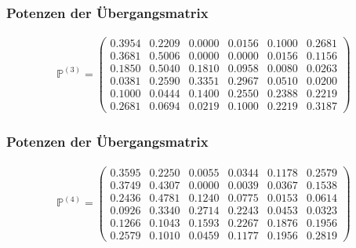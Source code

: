 \documentclass[draft,compress]{beamer}
\begin{document}
	\begin{frame}
		\frametitle{Potenzen der Übergangsmatrix}
		\begin{center}
			\begin{align*}
				\mathbb{P} ^{(3)} =
				\begin{pmatrix} 
				  0.3954 &  0.2209 &  0.0000 &  0.0156 &  0.1000 &  0.2681\\
				  0.3681 &  0.5006 &  0.0000 &  0.0000 &  0.0156 &  0.1156\\
				  0.1850 &  0.5040 &  0.1810 &  0.0958 &  0.0080 &  0.0263\\
				  0.0381 &  0.2590 &  0.3351 &  0.2967 &  0.0510 &  0.0200\\
				  0.1000 &  0.0444 &  0.1400 &  0.2550 &  0.2388 &  0.2219\\
				  0.2681 &  0.0694 &  0.0219 &  0.1000 &  0.2219 &  0.3187
				\end{pmatrix} 
			\end{align*}
		\end{center}
	\end{frame}


	\begin{frame}
		\frametitle{Potenzen der Übergangsmatrix}
		\begin{center}
			\begin{align*}
				\mathbb{P} ^{(4)} =
				\begin{pmatrix} 
				  0.3595 &  0.2250 &  0.0055 &  0.0344 &  0.1178 &  0.2579\\
				  0.3749 &  0.4307 &  0.0000 &  0.0039 &  0.0367 &  0.1538\\
				  0.2436 &  0.4781 &  0.1240 &  0.0775 &  0.0153 &  0.0614\\
				  0.0926 &  0.3340 &  0.2714 &  0.2243 &  0.0453 &  0.0323\\
				  0.1266 &  0.1043 &  0.1593 &  0.2267 &  0.1876 &  0.1956\\
				  0.2579 &  0.1010 &  0.0459 &  0.1177 &  0.1956 &  0.2819
				\end{pmatrix} 
			\end{align*}
		\end{center}
	\end{frame}
\end{document}
